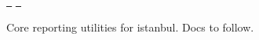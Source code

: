 \href{https://greenkeeper.io/}{\texttt{ }} \href{https://travis-ci.org/istanbuljs/istanbul-lib-report}{\texttt{ }}

Core reporting utilities for istanbul. Docs to follow. 